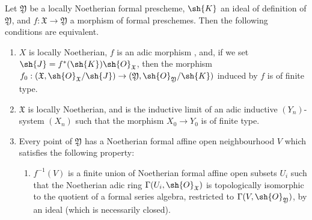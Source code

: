 \begin{proposition}[10.13.1]
\label{I.10.13.1}
Let $\mathfrak{Y}$ be a locally Noetherian formal prescheme, $\sh{K}$ an ideal of definition of $\mathfrak{Y}$, and $f:\mathfrak{X}\to\mathfrak{Y}$ a morphism of formal preschemes.
Then the following conditions are equivalent.
\begin{enumerate}
  \item[\rm{(a)}] $X$ is locally Noetherian, $f$ is an adic morphism , and, if we set $\sh{J}=f^*(\sh{K})\sh{O}_\mathfrak{X}$, then the morphism $f_0:(\mathfrak{X},\sh{O}_\mathfrak{X}/\sh{J})\to(\mathfrak{Y},\sh{O}_\mathfrak{Y}/\sh{K})$ induced by $f$ is of finite type.
  \item[\rm{(b)}] $\mathfrak{X}$ is locally Noetherian, and is the inductive limit of an adic inductive $(Y_n)$-system $(X_n)$ such that the morphism $X_0\to Y_0$ is of finite type.
  \item Every point of $\mathfrak{Y}$ has a Noetherian formal affine open neighbourhood $V$ which satisfies the following property:
\begin{enumerate}
  \item[(\textbf{Q})] $f^{-1}(V)$ is a finite union of Noetherian formal affine open subsets $U_i$ such that the Noetherian adic ring $\Gamma(U_i,\sh{O}_\mathfrak{X})$ is topologically isomorphic to the quotient of a formal series algebra, restricted  to $\Gamma(V,\sh{O}_\mathfrak{Y})$, by an ideal (which is necessarily closed).
\end{enumerate}
\end{enumerate}
\end{proposition}

